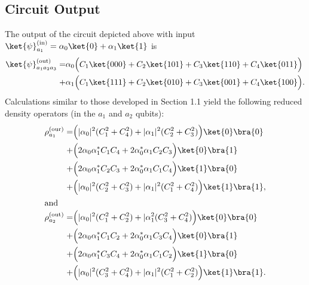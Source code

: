 \documentclass[reqno]{amsart}
\numberwithin{lemma}{section}
\numberwithin{proposition}{section}
\begin{document}
{}


\subsection{Circuit Output} 
The output of the circuit depicted above with input $\ket{\psi}^{\textnormal{(in)}}_{a_{1}}  = \alpha_{0} \ket{0} + \alpha_{1} \ket{1}$ is
\begin{align*}
	\ket{\psi}^{\textnormal{(out)}}_{a_{1}a_{2}a_{3}} = &\alpha_{0} \Big ( C_{1} \ket{000} + C_{2} \ket{101} + C_{3} \ket{110} + C_{4} \ket{011}  \Big ) \\
	 + & \alpha_{1} \Big ( C_{1} \ket{111} + C_{2} \ket{010} + C_{3} \ket{001} + C_{4} \ket{100} \Big ). 
\end{align*}
Calculations similar to those developed in Section 1.1 yield the following reduced density operators (in the $a_{1}$ and $a_{2}$ qubits):
\begin{align*}
	\rho_{a_{1}}^{\textnormal{(our)}} = &\Big ( \vert \alpha_{0} \vert^{2} (C_{1}^{2} + C_{4}^{2}) + \vert \alpha_{1} \vert^{2} (C_{2}^{2} + C_{3}^{2})\Big ) \ket{0}\bra{0} \\
	+ & \Big ( 2 \alpha_{0} \alpha_{1}^{*} C_{1}C_{4} + 2 \alpha_{0}^{*} \alpha_{1} C_{2} C_{3} \Big ) \ket{0}\bra{1}\\
	+ & \Big ( 2 \alpha_{0} \alpha_{1}^{*} C_{2} C_{3} + 2 \alpha_{0}^{*} \alpha_{1} C_{1} C_{4} \Big ) \ket{1}\bra{0}\\
	+ & \Big ( \vert \alpha_{0} \vert^{2} (C_{2}^{2} + C_{3}^{2}) + \vert \alpha_{1} \vert^{2} (C_{1}^{2} + C_{4}^{2}) \Big ) \ket{1}\bra{1},\\
	\intertext{and}
	\rho_{a_{2}}^{\textnormal{(out)}} = &\Big ( \vert \alpha_{0} \vert^{2} (C_{1}^{2} + C_{2}^{2}) + \vert \alpha_{1}^{2} (C_{3}^{2} + C_{4}^{2}) \Big ) \ket{0}\bra{0} \\
	+ & \Big ( 2 \alpha_{0} \alpha_{1}^{*} C_{1} C_{2} + 2 \alpha_{0}^{*} \alpha_{1} C_{3} C_{4} \Big ) \ket{0}\bra{1}\\
	+ & \Big ( 2 \alpha_{0} \alpha_{1}^{*} C_{3} C_{4} + 2 \alpha_{0}^{*} \alpha_{1} C_{1} C_{2} \Big ) \ket{1}\bra{0}\\
	+ & \Big ( \vert \alpha_{0} \vert^{2} (C_{3}^{2} + C_{4}^{2}) + \vert \alpha_{1} \vert^{2} ( C_{1}^{2} + C_{2}^{2}) \Big ) \ket{1}\bra{1}.\\
\end{align*}








\end{document}
